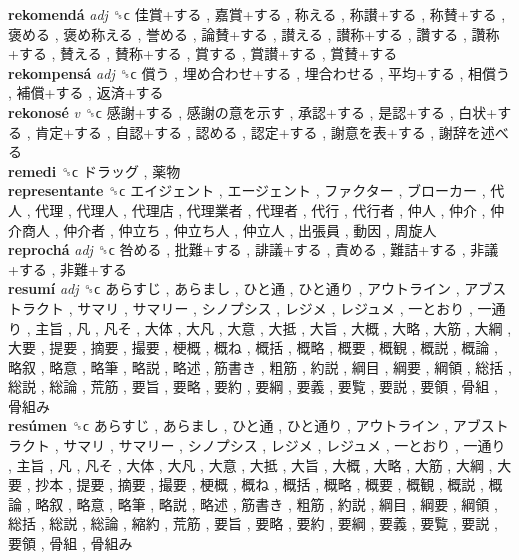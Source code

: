 \textbf{rekomendá} \emph{adj}  ␝ϲ   佳賞+する ,  嘉賞+する ,  称える ,  称讃+する ,  称賛+する ,  褒める ,  褒め称える ,  誉める ,  論賛+する ,  讃える ,  讃称+する ,  讚する ,  讚称+する ,  賛える ,  賛称+する ,  賞する ,  賞讃+する ,  賞賛+する   \\
\textbf{rekompensá} \emph{adj}  ␝ϲ   償う ,  埋め合わせ+する ,  埋合わせる ,  平均+する ,  相償う ,  補償+する ,  返済+する   \\
\textbf{rekonosé} \emph{v}  ␝ϲ   感謝+する ,  感謝の意を示す ,  承認+する ,  是認+する ,  白状+する ,  肯定+する ,  自認+する ,  認める ,  認定+する ,  謝意を表+する ,  謝辞を述べる   \\
\textbf{remedi} ␝ϲ   ドラッグ ,  薬物   \\
\textbf{representante} ␝ϲ   エイジェント ,  エージェント ,  ファクター ,  ブローカー ,  代人 ,  代理 ,  代理人 ,  代理店 ,  代理業者 ,  代理者 ,  代行 ,  代行者 ,  仲人 ,  仲介 ,  仲介商人 ,  仲介者 ,  仲立ち ,  仲立ち人 ,  仲立人 ,  出張員 ,  動因 ,  周旋人   \\
\textbf{reprochá} \emph{adj}  ␝ϲ   咎める ,  批難+する ,  誹議+する ,  責める ,  難詰+する ,  非議+する ,  非難+する   \\
\textbf{resumí} \emph{adj}  ␝ϲ   あらすじ ,  あらまし ,  ひと通 ,  ひと通り ,  アウトライン ,  アブストラクト ,  サマリ ,  サマリー ,  シノプシス ,  レジメ ,  レジュメ ,  一とおり ,  一通り ,  主旨 ,  凡 ,  凡そ ,  大体 ,  大凡 ,  大意 ,  大抵 ,  大旨 ,  大概 ,  大略 ,  大筋 ,  大綱 ,  大要 ,  提要 ,  摘要 ,  撮要 ,  梗概 ,  概ね ,  概括 ,  概略 ,  概要 ,  概観 ,  概説 ,  概論 ,  略叙 ,  略意 ,  略筆 ,  略説 ,  略述 ,  筋書き ,  粗筋 ,  約説 ,  綱目 ,  綱要 ,  綱領 ,  総括 ,  総説 ,  総論 ,  荒筋 ,  要旨 ,  要略 ,  要約 ,  要綱 ,  要義 ,  要覧 ,  要説 ,  要領 ,  骨組 ,  骨組み   \\
\textbf{resúmen} ␝ϲ   あらすじ ,  あらまし ,  ひと通 ,  ひと通り ,  アウトライン ,  アブストラクト ,  サマリ ,  サマリー ,  シノプシス ,  レジメ ,  レジュメ ,  一とおり ,  一通り ,  主旨 ,  凡 ,  凡そ ,  大体 ,  大凡 ,  大意 ,  大抵 ,  大旨 ,  大概 ,  大略 ,  大筋 ,  大綱 ,  大要 ,  抄本 ,  提要 ,  摘要 ,  撮要 ,  梗概 ,  概ね ,  概括 ,  概略 ,  概要 ,  概観 ,  概説 ,  概論 ,  略叙 ,  略意 ,  略筆 ,  略説 ,  略述 ,  筋書き ,  粗筋 ,  約説 ,  綱目 ,  綱要 ,  綱領 ,  総括 ,  総説 ,  総論 ,  縮約 ,  荒筋 ,  要旨 ,  要略 ,  要約 ,  要綱 ,  要義 ,  要覧 ,  要説 ,  要領 ,  骨組 ,  骨組み   \\

